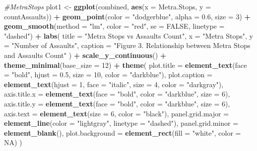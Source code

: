\documentclass[
]{article}
\newenvironment{Shaded}{\begin{snugshade}}{\end{snugshade}}
\newcommand{\AttributeTok}[1]{\textcolor[rgb]{0.13,0.29,0.53}{#1}}
\newcommand{\CommentTok}[1]{\textcolor[rgb]{0.56,0.35,0.01}{\textit{#1}}}
\newcommand{\ConstantTok}[1]{\textcolor[rgb]{0.56,0.35,0.01}{#1}}
\newcommand{\DecValTok}[1]{\textcolor[rgb]{0.00,0.00,0.81}{#1}}
\newcommand{\FloatTok}[1]{\textcolor[rgb]{0.00,0.00,0.81}{#1}}
\newcommand{\FunctionTok}[1]{\textcolor[rgb]{0.13,0.29,0.53}{\textbf{#1}}}
\newcommand{\NormalTok}[1]{#1}
\newcommand{\OtherTok}[1]{\textcolor[rgb]{0.56,0.35,0.01}{#1}}
\newcommand{\SpecialCharTok}[1]{\textcolor[rgb]{0.81,0.36,0.00}{\textbf{#1}}}
\newcommand{\StringTok}[1]{\textcolor[rgb]{0.31,0.60,0.02}{#1}}
\begin{document}
\begin{Shaded}
\begin{Highlighting}[]
\CommentTok{\#MetraStops}
\NormalTok{plot1 }\OtherTok{\textless{}{-}} \FunctionTok{ggplot}\NormalTok{(combined, }\FunctionTok{aes}\NormalTok{(}\AttributeTok{x =} \StringTok{\textasciigrave{}}\AttributeTok{Metra.Stops}\StringTok{\textasciigrave{}}\NormalTok{, }\AttributeTok{y =} \StringTok{\textasciigrave{}}\AttributeTok{countAssaults}\StringTok{\textasciigrave{}}\NormalTok{)) }\SpecialCharTok{+} 
  \FunctionTok{geom\_point}\NormalTok{(}\AttributeTok{color =} \StringTok{"dodgerblue"}\NormalTok{, }\AttributeTok{alpha =} \FloatTok{0.6}\NormalTok{, }\AttributeTok{size =} \DecValTok{3}\NormalTok{) }\SpecialCharTok{+}
  \FunctionTok{geom\_smooth}\NormalTok{(}\AttributeTok{method =} \StringTok{"lm"}\NormalTok{, }\AttributeTok{color =} \StringTok{"red"}\NormalTok{, }\AttributeTok{se =} \ConstantTok{FALSE}\NormalTok{, }\AttributeTok{linetype =} \StringTok{"dashed"}\NormalTok{) }\SpecialCharTok{+}
  \FunctionTok{labs}\NormalTok{(}
    \AttributeTok{title =} \StringTok{"Metra Stops vs Assaults Count"}\NormalTok{,  }
    \AttributeTok{x =} \StringTok{"Metra Stops"}\NormalTok{,}
    \AttributeTok{y =} \StringTok{"Number of Assaults"}\NormalTok{,}
    \AttributeTok{caption =} \StringTok{"Figure 3. Relationship between Metra Stops and Assaults Count"}
\NormalTok{  ) }\SpecialCharTok{+} 
  \FunctionTok{scale\_y\_continuous}\NormalTok{() }\SpecialCharTok{+} 
  \FunctionTok{theme\_minimal}\NormalTok{(}\AttributeTok{base\_size =} \DecValTok{12}\NormalTok{) }\SpecialCharTok{+}
  \FunctionTok{theme}\NormalTok{(}
    \AttributeTok{plot.title =} \FunctionTok{element\_text}\NormalTok{(}\AttributeTok{face =} \StringTok{"bold"}\NormalTok{, }\AttributeTok{hjust =} \FloatTok{0.5}\NormalTok{, }\AttributeTok{size =} \DecValTok{10}\NormalTok{, }\AttributeTok{color =} \StringTok{"darkblue"}\NormalTok{),}
    \AttributeTok{plot.caption =} \FunctionTok{element\_text}\NormalTok{(}\AttributeTok{hjust =} \DecValTok{1}\NormalTok{, }\AttributeTok{face =} \StringTok{"italic"}\NormalTok{, }\AttributeTok{size =} \DecValTok{4}\NormalTok{, }\AttributeTok{color =} \StringTok{"darkgray"}\NormalTok{),}
    \AttributeTok{axis.title.x =} \FunctionTok{element\_text}\NormalTok{(}\AttributeTok{face =} \StringTok{"bold"}\NormalTok{, }\AttributeTok{color =} \StringTok{"darkblue"}\NormalTok{, }\AttributeTok{size =} \DecValTok{6}\NormalTok{),}
    \AttributeTok{axis.title.y =} \FunctionTok{element\_text}\NormalTok{(}\AttributeTok{face =} \StringTok{"bold"}\NormalTok{, }\AttributeTok{color =} \StringTok{"darkblue"}\NormalTok{, }\AttributeTok{size =} \DecValTok{6}\NormalTok{),}
    \AttributeTok{axis.text =} \FunctionTok{element\_text}\NormalTok{(}\AttributeTok{size =} \DecValTok{6}\NormalTok{, }\AttributeTok{color =} \StringTok{"black"}\NormalTok{),}
    \AttributeTok{panel.grid.major =} \FunctionTok{element\_line}\NormalTok{(}\AttributeTok{color =} \StringTok{"lightgray"}\NormalTok{, }\AttributeTok{linetype =} \StringTok{"dashed"}\NormalTok{),}
    \AttributeTok{panel.grid.minor =} \FunctionTok{element\_blank}\NormalTok{(),}
    \AttributeTok{plot.background =} \FunctionTok{element\_rect}\NormalTok{(}\AttributeTok{fill =} \StringTok{"white"}\NormalTok{, }\AttributeTok{color =} \ConstantTok{NA}\NormalTok{)}
\NormalTok{  )}


\end{Highlighting}
\end{Shaded}
\end{document}
